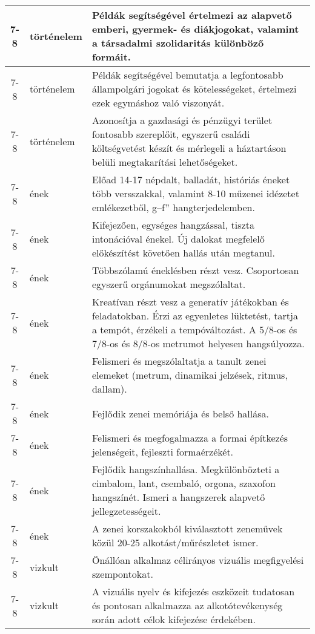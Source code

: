 \begin{small}
\begin{longtable}{c | p{2cm} |  p{11cm} }
              7-8 & történelem & Példák segítségével értelmezi az alapvető emberi, gyermek- és diákjogokat, valamint a társadalmi szolidaritás különböző formáit. \\ \hline
              7-8 & történelem & Példák segítségével bemutatja a legfontosabb állampolgári jogokat és kötelességeket, értelmezi ezek egymáshoz való viszonyát. \\ \hline
              7-8 & történelem & Azonosítja a gazdasági és pénzügyi terület fontosabb szereplőit, egyszerű családi költségvetést készít és mérlegeli a háztartáson belüli megtakarítási lehetőségeket. \\ \hline
              7-8 & ének & Előad 14-17 népdalt, balladát, históriás éneket több versszakkal, valamint 8-10 műzenei idézetet emlékezetből, g–f” hangterjedelemben. \\ \hline
              7-8 & ének & Kifejezően, egységes hangzással, tiszta intonációval énekel. Új dalokat megfelelő előkészítést követően hallás után megtanul. \\ \hline
              7-8 & ének & Többszólamú éneklésben részt vesz. Csoportosan egyszerű orgánumokat megszólaltat. \\ \hline
              7-8 & ének & Kreatívan  részt vesz a generatív játékokban és feladatokban. Érzi az egyenletes lüktetést, tartja a tempót, érzékeli a tempóváltozást. A 5/8-os és 7/8-os és 8/8-os metrumot helyesen hangsúlyozza. \\ \hline
              7-8 & ének & Felismeri és megszólaltatja a tanult zenei elemeket (metrum, dinamikai jelzések, ritmus, dallam). \\ \hline
              7-8 & ének & Fejlődik zenei memóriája és belső hallása. \\ \hline
              7-8 & ének & Felismeri és megfogalmazza a formai építkezés jelenségeit, fejleszti formaérzékét. \\ \hline
              7-8 & ének & Fejlődik hangszínhallása. Megkülönbözteti a cimbalom, lant, csembaló, orgona, szaxofon hangszínét. Ismeri a hangszerek alapvető jellegzetességeit. \\ \hline
              7-8 & ének & A zenei korszakokból kiválasztott zeneművek közül 20-25 alkotást/műrészletet ismer. \\ \hline
              7-8 & vizkult & Önállóan alkalmaz célirányos vizuális megfigyelési szempontokat. \\ \hline
              7-8 & vizkult & A vizuális nyelv és kifejezés eszközeit tudatosan és pontosan alkalmazza az alkotótevékenység során adott célok kifejezése érdekében. \\ \hline

\end{longtable}
\end{small}
